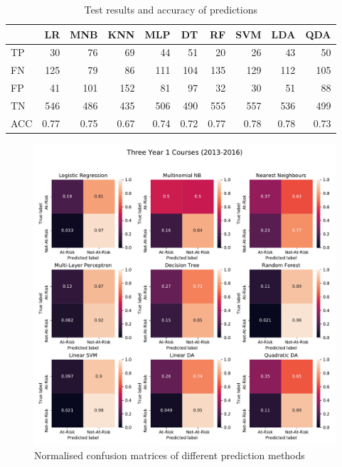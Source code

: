 \documentclass[a4paper]{report}
\begin{document}
\begin{table}[H]
  \centering
  \begin{tabular}{lrrrrrrrrr}
    \toprule
    {} &   LR &  MNB &  KNN &  MLP &   DT &   RF &  SVM &  LDA &  QDA \\
    \midrule
    TP  &   30 &   76 &   69 &   44 &   51 &   20 &   26 &   43 &   50 \\
    FN  &  125 &   79 &   86 &  111 &  104 &  135 &  129 &  112 &  105 \\
    FP  &   41 &  101 &  152 &   81 &   97 &   32 &   30 &   51 &   88 \\
    TN  &  546 &  486 &  435 &  506 &  490 &  555 &  557 &  536 &  499 \\
    ACC & 0.77 & 0.75 & 0.67 & 0.74 & 0.72 & 0.77 & 0.78 & 0.78 & 0.73 \\
    \bottomrule
  \end{tabular}
  \caption{\label{tab:ML_PPS_bin_pre17}Test results and accuracy of predictions}
\end{table}

\begin{figure}[H]
  \centering
  \includegraphics[width=\linewidth]{fig/ML_Y1Fs_bin_pre17.pdf}
  \caption{\label{fig:ML_Y1Fs_bin_pre17}Normalised confusion matrices of different prediction methods}
\end{figure}
\end{document}
